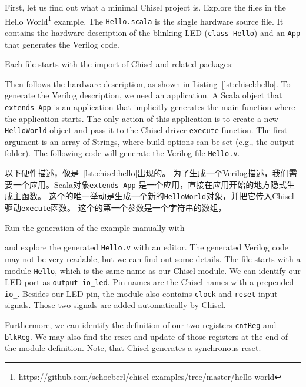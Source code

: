 \documentclass[%
    10pt,
    headinclude, footexclude,
    openright, %
    notitlepage,
    cleardoubleempty,
    headsepline,
    pointlessnumbers,
    bibtotoc, idxtotoc,
    ]{scrbook}
\newcommand{\code}[1]{{\small{\texttt{#1}}}}
\newcommand{\myref}[2]{\href{#1}{#2}}
\renewcommand{\myref}[2]{{#2}{\footnote{\url{#1}}}}
\begin{document}
First, let us find out what a minimal Chisel project is. Explore the files in the
\myref{https://github.com/schoeberl/chisel-examples/tree/master/hello-world}{Hello World}
example.
The \code{Hello.scala} is the single hardware source file.
It contains the hardware description of the blinking LED (\code{class Hello})
and an \code{App} that generates the Verilog code.

Each file starts with the import of Chisel and related packages:


\noindent Then follows the hardware description, as shown in Listing~\ref{lst:chisel:hello}.
To generate the Verilog description, we need an application. A Scala object that \code{extends App}
is an application that implicitly generates the main function where the application starts.
The only action of this application is to create a new \code{HelloWorld} object and pass it
to the Chisel driver \code{execute} function. The first argument is an array of Strings,
where build options can be set (e.g., the output folder). The following code will
generate the Verilog file \code{Hello.v}.

\noindent 以下硬件描述，像是~\ref{lst:chisel:hello}出现的。
为了生成一个Verilog描述，我们需要一个应用。Scala对象\code{extends App}
是一个应用，直接在应用开始的地方隐式生成主函数。
这个的唯一举动是生成一个新的\code{HelloWorld}对象，并把它传入Chisel驱动\code{execute}函数。
这个的第一个参数是一个字符串的数组，






\noindent Run the generation of the example manually with


and explore the generated \code{Hello.v} with an editor. The generated Verilog code may not be
very readable, but we can find out some details. The file starts with a module \code{Hello},
which is the same name as our Chisel module. We can identify our LED port as
\code{output io\_led}. Pin names are the Chisel names with a prepended \code{io\_}.
Besides our LED pin, the module also contains \code{clock} and \code{reset} input signals.
Those two signals are added automatically by Chisel.

Furthermore, we can identify the definition of our two registers \code{cntReg} and \code{blkReg}.
We may also find the reset and update of those registers at the end of the module definition.
Note, that Chisel generates a synchronous reset.
\end{document}
